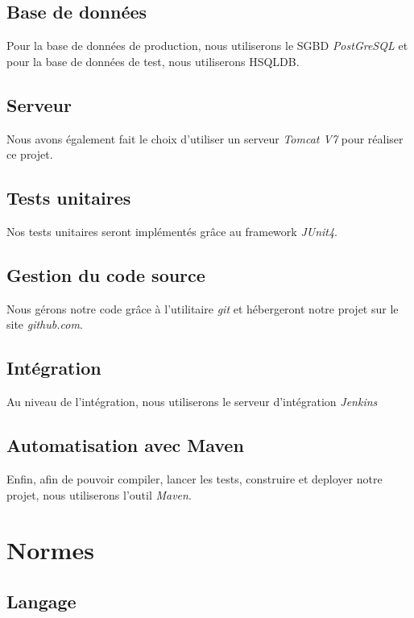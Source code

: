 \documentclass[11pt]{article}
\begin{document}
\subsection{Base de données}

Pour la base de données de production, nous utiliserons le SGBD \emph{PostGreSQL} et pour la base de données de test, nous utiliserons HSQLDB.

\subsection{Serveur}

Nous avons également fait le choix d'utiliser un serveur \emph{Tomcat V7} pour réaliser ce projet.

\subsection{Tests unitaires}

Nos tests unitaires seront implémentés grâce au framework \emph{JUnit4}.

\subsection{Gestion du code source}

Nous gérons notre code grâce à l'utilitaire \emph{git} et hébergeront notre projet sur le site \emph{github.com}.

\subsection{Intégration}

Au niveau de l'intégration, nous utiliserons le serveur d'intégration \emph{Jenkins}

\subsection{Automatisation avec Maven}

Enfin, afin de pouvoir compiler, lancer les tests, construire et deployer notre projet, nous utiliserons l'outil \emph{Maven}.

\section{Normes}

\subsection{Langage}
\end{document}
